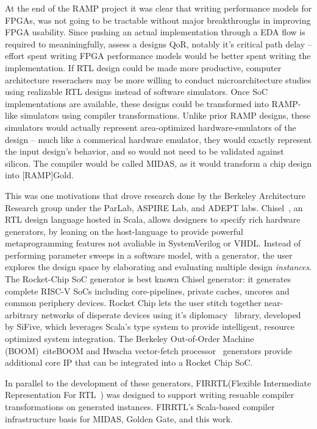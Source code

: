 At the end of the RAMP project it was clear that writing performance models for
FPGAs, was not going to be tractable without major breakthroughs in improving
FPGA usability. Since pushing an actual implementation through a EDA flow is
required to meaniningfully, assess a designs QoR, notably it's critical path
delay -- effort spent writing FPGA performance models would be better spent
writing the implementation. If RTL design could be made more productive,
computer architecture reserachers may be more willing to conduct
microarchitecture studies using realizable RTL designs instead of software
simulators. Once SoC implementations are available, these designs could be
transformed into RAMP-like simulators using compiler transformations. Unlike
prior RAMP designs, these simulators would actually represent area-optimized
hardware-emulators of the design -- much like a commerical hardware emulator,
they would exactly represent the input design's behavior, and so would not need
to be validated against silicon. The compiler would be called MIDAS, as it would transform
a chip design into [RAMP]Gold.

This was one motivations that drove research done by the Berkeley Architecture
Research group under the ParLab, ASPIRE Lab, and ADEPT labs.
Chisel~\cite{Chisel}, an RTL design language hosted in Scala, allows designers
to specify rich hardware generators, by leaning on the host-language to provide
powerful metaprogramming features not avaliable in SystemVerilog or VHDL.
Instead of performing parameter sweeps in a software model, with a generator,
the user explores the design space by elaborating and evaluating multiple
design \emph{instances}. The Rocket-Chip SoC generator\cite{RocketChip} is best
known Chisel generator: it generates complete RISC-V SoCs including
core-pipelines, private caches, uncores and common periphery devices. Rocket
Chip lets the user stitch together near-arbitrary networks of disperate devices
using it's diplomacy~\cite{Diplomacy} library, developed by SiFive, which leverages Scala's type
system to provide intelligent, resource optimized system integration. The
Berkeley Out-of-Order Machine (BOOM)~cite{BOOM} and Hwacha vector-fetch
processor~\cite{Hwacha} generators provide additional core IP that can be
integrated into a Rocket Chip SoC.

In parallel to the development of these generators, FIRRTL(Flexible
Intermediate Representation For RTL~\cite{FIRRTL}) was designed to support
writing resuable compiler transformations on generated instances. FIRRTL's
Scala-based compiler infrastructure basis for MIDAS, Golden Gate, and this work.

